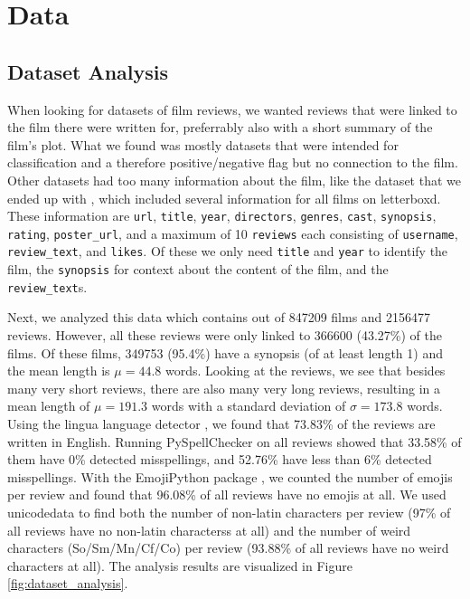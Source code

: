 \section{Data} \label{sec:data}


\subsection{Dataset Analysis} \label{subsec:dataset}
When looking for datasets of film reviews, we wanted reviews that were linked to the film there were written for, preferrably also with a short summary of the film's plot.
What we found was mostly datasets that were intended for classification and a therefore positive/negative flag but no connection to the film.
Other datasets had too many information about the film, like the dataset that we ended up with \cite{dataset}, which included several information for all films on letterboxd.
These information are \texttt{url}, \texttt{title}, \texttt{year}, \texttt{directors}, \texttt{genres}, \texttt{cast}, \texttt{synopsis}, \texttt{rating}, \texttt{poster\_url}, and a maximum of 10 \texttt{reviews} each consisting of \texttt{username}, \texttt{review\_text}, and \texttt{likes}.
Of these we only need \texttt{title} and \texttt{year} to identify the film, the \texttt{synopsis} for context about the content of the film, and the \texttt{review\_text}s.

Next, we analyzed this data which contains out of 847209 films and 2156477 reviews.
However, all these reviews were only linked to 366600 (43.27\%) of the films.
Of these films, 349753 (95.4\%) have a synopsis (of at least length 1) and the mean length is $\mu=44.8$ words.
Looking at the reviews, we see that besides many very short reviews, there are also many very long reviews, resulting in a mean length of $\mu=191.3$ words with a standard deviation of $\sigma=173.8$ words.
Using the lingua language detector \cite{lingua}, we found that 73.83\% of the reviews are written in English.
Running PySpellChecker \cite{PySpellChecker} on all reviews showed that 33.58\% of them have 0\% detected misspellings, and 52.76\% have less than 6\% detected misspellings.
With the EmojiPython package \cite{EmojiPython}, we counted the number of emojis per review and found that 96.08\% of all reviews have no emojis at all.
We used unicodedata \cite{unicodedata} to find both the number of non-latin characters per review (97\% of all reviews have no non-latin characterss at all) and the number of weird characters (So/Sm/Mn/Cf/Co) per review (93.88\% of all reviews have no weird characters at all).
The analysis results are visualized in Figure \ref{fig:dataset_analysis}.

